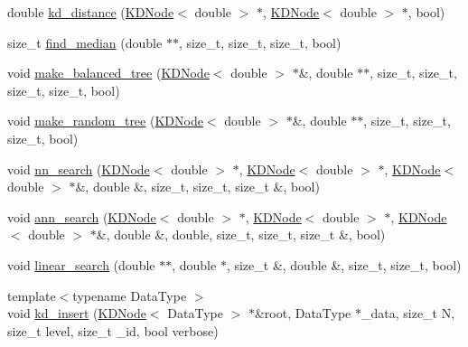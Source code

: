 \begin{DoxyCompactItemize}
double \hyperlink{namespaceSimpleCluster_ab268f110e34b3762c1de5b7fe4eda10c}{kd\-\_\-distance} (\hyperlink{classSimpleCluster_1_1KDNode}{K\-D\-Node}$<$ double $>$ $\ast$, \hyperlink{classSimpleCluster_1_1KDNode}{K\-D\-Node}$<$ double $>$ $\ast$, bool)
\item 
size\-\_\-t \hyperlink{namespaceSimpleCluster_aac5892d8292ef724345d8c422519ae05}{find\-\_\-median} (double $\ast$$\ast$, size\-\_\-t, size\-\_\-t, size\-\_\-t, bool)
\item 
void \hyperlink{namespaceSimpleCluster_a9b7733dc2edec70ad323beb9f3a9143e}{make\-\_\-balanced\-\_\-tree} (\hyperlink{classSimpleCluster_1_1KDNode}{K\-D\-Node}$<$ double $>$ $\ast$\&, double $\ast$$\ast$, size\-\_\-t, size\-\_\-t, size\-\_\-t, size\-\_\-t, bool)
\item 
void \hyperlink{namespaceSimpleCluster_a3c8460d2b4a2bfc0598da219d9665c6b}{make\-\_\-random\-\_\-tree} (\hyperlink{classSimpleCluster_1_1KDNode}{K\-D\-Node}$<$ double $>$ $\ast$\&, double $\ast$$\ast$, size\-\_\-t, size\-\_\-t, size\-\_\-t, bool)
\item 
void \hyperlink{namespaceSimpleCluster_a7dd13cfc1bf21009874caf0acc858606}{nn\-\_\-search} (\hyperlink{classSimpleCluster_1_1KDNode}{K\-D\-Node}$<$ double $>$ $\ast$, \hyperlink{classSimpleCluster_1_1KDNode}{K\-D\-Node}$<$ double $>$ $\ast$, \hyperlink{classSimpleCluster_1_1KDNode}{K\-D\-Node}$<$ double $>$ $\ast$\&, double \&, size\-\_\-t, size\-\_\-t, size\-\_\-t \&, bool)
\item 
void \hyperlink{namespaceSimpleCluster_ad1d8cb188a5d775379be76009a662fc8}{ann\-\_\-search} (\hyperlink{classSimpleCluster_1_1KDNode}{K\-D\-Node}$<$ double $>$ $\ast$, \hyperlink{classSimpleCluster_1_1KDNode}{K\-D\-Node}$<$ double $>$ $\ast$, \hyperlink{classSimpleCluster_1_1KDNode}{K\-D\-Node}$<$ double $>$ $\ast$\&, double \&, double, size\-\_\-t, size\-\_\-t, size\-\_\-t \&, bool)
\item 
void \hyperlink{namespaceSimpleCluster_ad2d8bf0284b8790eaf448766b3f17153}{linear\-\_\-search} (double $\ast$$\ast$, double $\ast$, size\-\_\-t \&, double \&, size\-\_\-t, size\-\_\-t, bool)
\item 
{\footnotesize template$<$typename Data\-Type $>$ }\\void \hyperlink{namespaceSimpleCluster_af123d4d34a2721969c8e206492ec576a}{kd\-\_\-insert} (\hyperlink{classSimpleCluster_1_1KDNode}{K\-D\-Node}$<$ Data\-Type $>$ $\ast$\&root, Data\-Type $\ast$\-\_\-data, size\-\_\-t N, size\-\_\-t level, size\-\_\-t \-\_\-id, bool verbose)
\item 

\end{DoxyCompactItemize}
